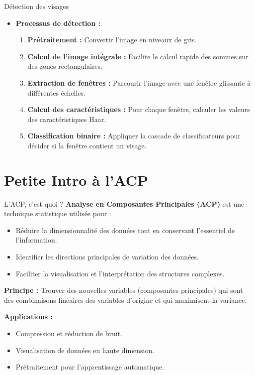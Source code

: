 \documentclass{beamer}
\begin{document}
\begin{frame}{Détection des visages}
    \begin{itemize}
        \item \textbf{Processus de détection :}
              \begin{enumerate}
                  \item \textbf{Prétraitement :} Convertir l'image en niveaux de gris.
                  \item \textbf{Calcul de l'image intégrale :} Facilite le calcul rapide des sommes sur des zones rectangulaires.
                  \item \textbf{Extraction de fenêtres :} Parcourir l'image avec une fenêtre glissante à différentes échelles.
                  \item \textbf{Calcul des caractéristiques :} Pour chaque fenêtre, calculer les valeurs des caractéristiques Haar.
                  \item \textbf{Classification binaire :} Appliquer la cascade de classificateurs pour décider si la fenêtre contient un visage.
              \end{enumerate}
    \end{itemize}
\end{frame}

\section{Petite Intro à l'ACP}
\begin{frame}{L'ACP, c'est quoi ?}
    \textbf{Analyse en Composantes Principales (ACP)} est une technique statistique utilisée pour :
    \begin{itemize}
        \item Réduire la dimensionnalité des données tout en conservant l'essentiel de l'information.
        \item Identifier les directions principales de variation des données.
        \item Faciliter la visualisation et l'interprétation des structures complexes.
    \end{itemize}
    
    \textbf{Principe :} Trouver des nouvelles variables (composantes principales) qui sont des combinaisons linéaires des variables d'origine et qui maximisent la variance.
    
    \textbf{Applications :}
    \begin{itemize}
        \item Compression et réduction de bruit.
        \item Visualisation de données en haute dimension.
        \item Prétraitement pour l'apprentissage automatique.
    \end{itemize}
    
\end{frame}
\end{document}
